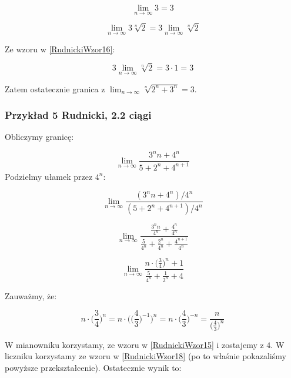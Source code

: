 \documentclass[a4paper,oneside,openright,11pt]{article}
\numberwithin{equation}{section}
\begin{document}
\begin{equation*}
    \lim_{n\to\infty} 3 = 3
\end{equation*}

\begin{equation*}
    \lim_{n\to\infty} 3 \sqrt[n]{2} = 3 \lim_{n\to\infty} \sqrt[n]{2}
\end{equation*}

Ze wzoru w \ref{RudnickiWzor16}:

\begin{equation*}
    3 \lim_{n\to\infty} \sqrt[n]{2} = 3 \cdot 1 = 3
\end{equation*}

\vspace{10mm}
Zatem ostatecznie granica z $\lim_{n\to\infty} \sqrt[n]{2^{n} + 3^n} = 3$.

\subsubsection{Przykład 5 Rudnicki, 2.2 ciągi}

Obliczymy granicę: 

\begin{equation*}
    \lim_{n\to\infty} \frac{3^{n}n + 4^{n}}{5 + 2^{n} + 4^{n + 1}}
\end{equation*}
\noindent
Podzielmy ułamek przez $4^n$:

\begin{equation*}
    \lim_{n\to\infty} \frac{(3^{n}n + 4^{n}) / 4^n}{(5 + 2^{n} + 4^{n + 1}) / 4^n}
\end{equation*}

\begin{equation*}
    \lim_{n\to\infty} \frac{\frac{3^{n}n}{4^n} + \frac{4^n}{4^n}}{\frac{5}{4^n} + \frac{2^n}{4^n} + \frac{4^{n+1}}{4^n}}
\end{equation*}

\begin{equation*}
    \lim_{n\to\infty} \frac{n \cdot \Big(\frac{3}{4} \Big)^{n} + 1}{\frac{5}{4^n} + \frac{1}{2^n} + 4}
\end{equation*}

Zauważmy, że:

\begin{equation*}
    n \cdot \Big(\frac{3}{4}\Big)^{n} = n \cdot \Big(\big(\frac{4}{3}\big)^{-1}\Big)^{n} = n \cdot \Big(\frac{4}{3}\Big)^{-n} = \frac{n}{\Big(\frac{4}{3}\Big)^{n}}
\end{equation*}

W mianowniku korzystamy, ze wzoru w \ref{RudnickiWzor15} i zostajemy z $4$. W liczniku korzystamy ze wzoru w \ref{RudnickiWzor18} (po to właśnie pokazaliśmy powyższe przekształcenie).
Ostatecznie wynik to:
\end{document}
